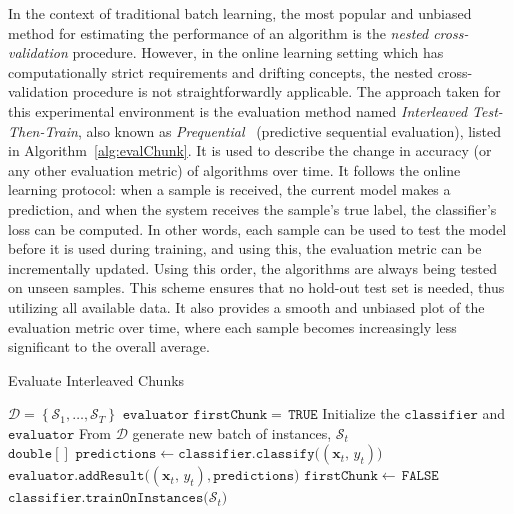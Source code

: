 \documentclass[reqno]{vcuthesis}
\newcommand{\set}[1]{{\left\{#1\right\}}}
\newcommand{\proc}{{\mathcal D}}
\numberwithin{equation}{chapter}
\begin{document}
In the context of traditional batch learning, the most popular and unbiased method for estimating the performance of an algorithm is the \textit{nested cross-validation} procedure. However, in the online learning setting which has computationally strict requirements and drifting concepts, the nested cross-validation procedure is not straightforwardly applicable. The approach taken for this experimental environment is the evaluation method named \textit{Interleaved Test-Then-Train}, also known as \textit{Prequential}~\cite{gama2013evaluating} (predictive sequential evaluation), listed in Algorithm~\ref{alg:evalChunk}. It is used to describe the change in accuracy (or any other evaluation metric) of algorithms over time. It follows the online learning protocol: when a sample is received, the current model makes a prediction, and when the system receives the sample's true label, the classifier's loss can be computed. In other words, each sample can be used to test the model before it is used during training, and using this, the evaluation metric can be incrementally updated. Using this order, the algorithms are always being tested on unseen samples. This scheme ensures that no hold-out test set is needed, thus utilizing all available data. It also provides a smooth and unbiased plot of the evaluation metric over time, where each sample becomes increasingly less significant to the overall average. 
\begin{algorithm}[t!]
\centering \small
\caption{Evaluate Interleaved Chunks}
\label{alg:evalChunk} 
\begin{algorithmic}[1]
\renewcommand{\algorithmicrequire}{\textbf{Input:}}
\renewcommand{\algorithmicensure}{\textbf{Output:}}
\Require $\proc = \set{\mathcal{S}_1,\ldots,\mathcal{S}_T}$
\Ensure  $\mathtt{evaluator}$
\State $\mathtt{firstChunk =\,TRUE}$
\State Initialize the $\mathtt{classifier}$ and $\mathtt{evaluator}$
\While{$\proc \neq \emptyset$}
\State From $\proc$ generate new batch of instances, $\mathcal{S}_t$
\State $\mathtt{double[]\,\,predictions} \leftarrow \mathtt{classifier.classify(}(\bm x_t,\, y_t)\mathtt{)}$ 
\State $\mathtt{evaluator.addResult(}(\bm x_t,\, y_t)\mathtt{, predictions)}$
\EndFor
\Else 
\State $\mathtt{firstChunk} \leftarrow\,\mathtt{FALSE}$
\EndIf
\State $\mathtt{classifier.trainOnInstances(}\mathcal{S}_t\mathtt{)}$
\EndWhile
\end{algorithmic} 
\end{algorithm}
\end{document}
